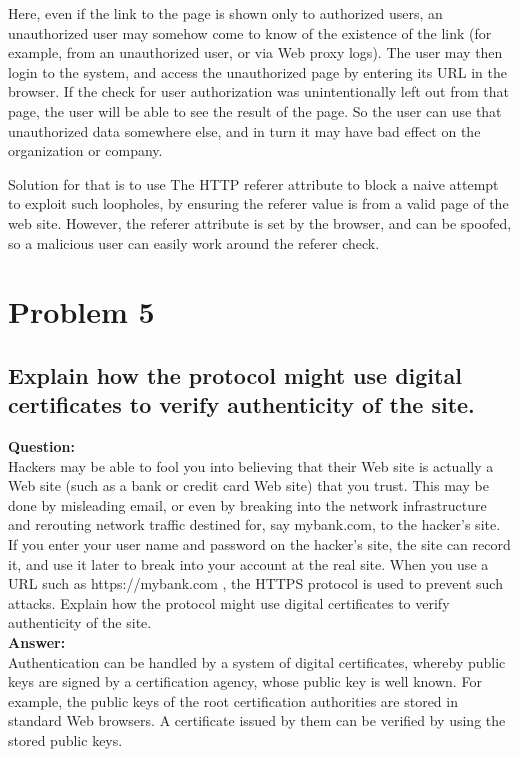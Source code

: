 \documentclass[12pt]{article}
\begin{document}
Here, even if the link to the page is shown only to authorized users,
an unauthorized user may somehow come to know of the existence of the
link (for example, from an unauthorized user, or via Web proxy logs). The
user may then login to the system, and access the unauthorized page by
entering its URL in the browser. If the check for user authorization was
unintentionally left out from that page, the user will be able to see the result
of the page. So the user can use that unauthorized data somewhere else, and in turn it may have bad effect on the organization or company. 

Solution for that is to use The HTTP referer attribute to block a naive attempt to exploit such loopholes, by ensuring the referer value is from a valid page of the web site. However, the referer attribute is set by the browser, and can be spoofed, so a malicious user can easily work around the referer check.

\singlespacing 
\newpage

\section{Problem 5}
\subsection*{Explain how the protocol might use digital certificates to verify authenticity of the site.}

\textbf{Question:} \\ 
Hackers may be able to fool you into believing that their Web site is actually a Web site (such as a bank or credit card Web site) that you trust. This may be done by misleading email, or even by breaking into the network infrastructure and rerouting network traffic destined for, say mybank.com, to the hacker’s site. If you enter your user name and password on the hacker’s site, the site can record it, and use it later to break into your account at the real site. When you use a URL such as https://mybank.com , the HTTPS protocol is used to prevent such attacks. Explain how the protocol might use digital certificates to verify authenticity of the site. \\

\noindent
\textbf{Answer: } \\ 
Authentication can be handled by a system of digital certificates, whereby public keys are signed by a certification agency, whose public key is well known. For example, the public keys of the root certification authorities are stored in standard Web browsers. A certificate issued by them can be verified by using the stored public keys.
\end{document}
